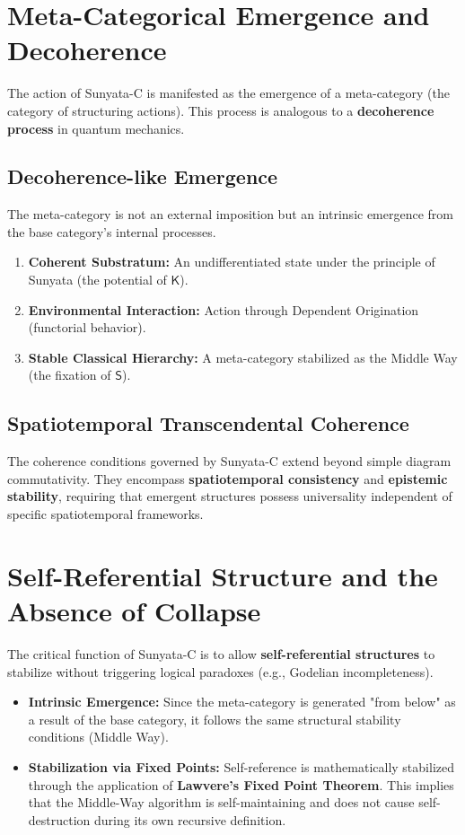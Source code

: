 \documentclass[12pt,a4paper]{article}
\begin{document}
\section{Meta-Categorical Emergence and Decoherence}
The action of Sunyata-C is manifested as the emergence of a meta-category (the category of structuring actions). This process is analogous to a \textbf{decoherence process} in quantum mechanics.

\subsection{Decoherence-like Emergence}
The meta-category is not an external imposition but an intrinsic emergence from the base category's internal processes.
\begin{enumerate}
    \item \textbf{Coherent Substratum:} An undifferentiated state under the principle of Sunyata (the potential of $\mathsf{K}$).
    \item \textbf{Environmental Interaction:} Action through Dependent Origination (functorial behavior).
    \item \textbf{Stable Classical Hierarchy:} A meta-category stabilized as the Middle Way (the fixation of $\mathsf{S}$).
\end{enumerate}

\subsection{Spatiotemporal Transcendental Coherence}
The coherence conditions governed by Sunyata-C extend beyond simple diagram commutativity. They encompass \textbf{spatiotemporal consistency} and \textbf{epistemic stability}, requiring that emergent structures possess universality independent of specific spatiotemporal frameworks.

\section{Self-Referential Structure and the Absence of Collapse}
The critical function of Sunyata-C is to allow \textbf{self-referential structures} to stabilize without triggering logical paradoxes (e.g., Godelian incompleteness).
\begin{itemize}
    \item \textbf{Intrinsic Emergence:} Since the meta-category is generated "from below" as a result of the base category, it follows the same structural stability conditions (Middle Way).
    \item \textbf{Stabilization via Fixed Points:} Self-reference is mathematically stabilized through the application of \textbf{Lawvere's Fixed Point Theorem}. This implies that the Middle-Way algorithm is self-maintaining and does not cause self-destruction during its own recursive definition.
\end{itemize}
\end{document}
